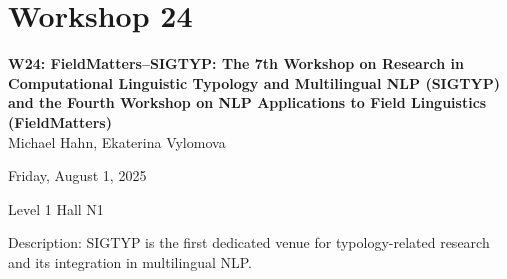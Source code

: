 \clearpage


\section[W24: FieldMatters–SIGTYP: The 7th Workshop on Research in Computational Linguistic Typology and Multilingual NLP (SIGTYP) and the Fourth Workshop on NLP Applications to Field Linguistics (FieldMatters)]{Workshop 24}
\label{workshop_24}

\begin{center}
    {\Large \textbf{W24: FieldMatters–SIGTYP: The 7th Workshop on Research in Computational Linguistic Typology and Multilingual NLP (SIGTYP) and the Fourth Workshop on NLP Applications to Field Linguistics (FieldMatters)}}\\
    

Michael Hahn, Ekaterina Vylomova

    Friday, August 1, 2025

 Level 1 Hall N1
    
\end{center}

Description: SIGTYP is the first dedicated venue for typology-related research and its integration in multilingual NLP.

